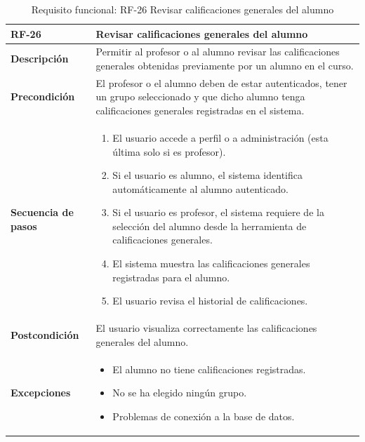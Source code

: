 \begin{table}[H]
\centering
\begin{tabularx}{\textwidth}{
  |>{\centering\arraybackslash}l
  |>{\centering\arraybackslash}X|}
\hline
\textbf{RF-26} & \textbf{Revisar calificaciones generales del alumno} \\ \hline

\textbf{Descripción} & Permitir al profesor o al alumno revisar las calificaciones generales obtenidas previamente por un alumno en el curso. \\ \hline

\textbf{Precondición} & El profesor o el alumno deben de estar autenticados, tener un grupo seleccionado y que dicho alumno tenga calificaciones generales registradas en el sistema. \\ \hline

\textbf{Secuencia de pasos} &
\begin{enumerate}
  \item El usuario accede a perfil o a administración (esta última solo si es profesor).
  \item Si el usuario es alumno, el sistema identifica automáticamente al alumno autenticado.
  \item Si el usuario es profesor, el sistema requiere de la selección del alumno desde la herramienta de calificaciones generales.
  \item El sistema muestra las calificaciones generales registradas para el alumno.
  \item El usuario revisa el historial de calificaciones.
\end{enumerate} \\ \hline

\textbf{Postcondición} & El usuario visualiza correctamente las calificaciones generales del alumno. \\ \hline

\textbf{Excepciones} &
\begin{itemize}
  \item El alumno no tiene calificaciones registradas.
  \item No se ha elegido ningún grupo.
  \item Problemas de conexión a la base de datos.
\end{itemize} \\ \hline
\end{tabularx}
\caption{Requisito funcional: RF-26 Revisar calificaciones generales del alumno}
\label{tab:RF-26}
\end{table}
